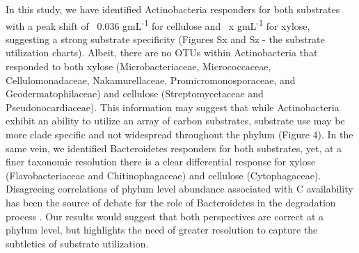 In this study, we have identified Actinobacteria responders for both substrates with a peak shift of ~0.036 gmL\textsuperscript{-1} for cellulose and ~x gmL\textsuperscript{-1} for xylose, suggesting a strong substrate specificity (Figures Sx and Sz - the substrate utilization charts). Albeit, there are no OTUs within Actinobacteria that responded to both xylose (Microbacteriaceae, Micrococcaceae, Cellulomonadaceae, Nakamurellaceae, Promicromonosporaceae, and Geodermatophilaceae) and cellulose (Streptomycetaceae and Pseudonocardiaceae). This information may suggest that while Actinobacteria exhibit an ability to utilize an array of carbon substrates, substrate use may be more clade specific and not widespread throughout the phylum (Figure 4). In the same vein, we identified Bacteroidetes responders for both substrates, yet, at a finer taxonomic resolution there is a clear differential response for xylose (Flavobacteriaceae and Chitinophagaceae) and cellulose (Cytophagaceae). Disagreeing correlations of phylum level abundance associated with C availability has been the source of debate for the role of Bacteroidetes in the degradation process \cite{Fierer_2007,Rui_2009,Sharp_2000,L_pez_Lozano_2013,Bastian_2009}. Our results would suggest that both perspectives are correct at a phylum level, but highlights the need of greater resolution to capture the subtleties of substrate utilization.   

